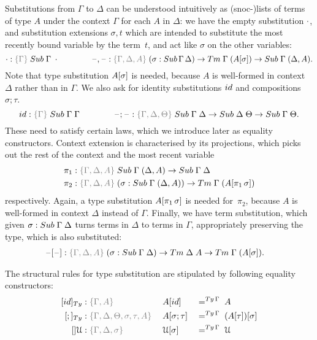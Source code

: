 \documentclass[a4paper,UKenglish,numberwithinsect,cleveref,thm-restate]{lipics-v2021}
\begin{document}
Substitutions from $\Gamma$ to $\Delta$ can be understood intuitively as (snoc-)lists of terms of type $A$ under the context $\Gamma$ for each $A$ in $\Delta$: we have the empty substitution $\cdot$, and substitution extensions $\sigma, t$ which are intended to substitute the most recently bound variable by the term~$t$, and act like $\sigma$ on the other variables:
\[
  \emptysub : \implicit{\Gamma}\;\Sub\;\Gamma\;\emptyctx
  \qquad\qquad
  \blank,\blank : \implicit{\Gamma, \Delta, A}\; (\sigma : \Sub\,\Gamma\,\Delta) \to \Tm\;\Gamma\;(\sub{A}{\sigma}) \to \Sub\;\Gamma\;(\Delta, A).
\]
Note that type substitution ${{A}[ \sigma ]}$ is needed, because $A$ is well-formed in context $\Delta$ rather than in $\Gamma$.
We also ask for identity substitutions $\idS$ and compositions $\sigma;\tau$.
\[
  \idS : \implicit{\Gamma}\; \Sub\;\Gamma\;\Gamma
  \qquad\qquad \blank;\blank : \implicit{\Gamma, \Delta, \Theta}\;\Sub\;\Gamma\;\Delta \to \Sub\;\Delta\;\Theta \to \Sub\;\Gamma\;\Theta.
\]
These need to satisfy certain laws, which we introduce later as equality constructors.
Context extension is characterised by its projections, which picks out the rest of the context and the most recent variable
\begin{alignat*}{3}
  \pi_1 & : \implicit{\Gamma, \Delta, A}\;\Sub\;\Gamma\;(\Delta, A) \to \Sub\;\Gamma\;\Delta \\
  \pi_2 & : \implicit{\Gamma, \Delta, A}\;(\sigma : \Sub\;\Gamma\;(\Delta, A)) \to \Tm\;\Gamma\;(\sub{A}{\pi_1\,\sigma})
\end{alignat*}
respectively.
Again, a type substitution ${{A}[ \pi_1\,\sigma ]}$ is needed for~$\pi_2$, because $A$ is well-formed in context $\Delta$ instead of $\Gamma$.
Finally, we have term substitution, which given $\sigma : \Sub\;\Gamma\;\Delta$ turns terms in $\Delta$ to terms in $\Gamma$, appropriately preserving the type, which is also substituted:
\begin{alignat*}{3}
  \sub{\blank}{\blank} & : \implicit{\Gamma,\Delta, A}\;(\sigma : \Sub\;\Gamma\;\Delta) \to \Tm\;\Delta\;A \to \Tm\;\Gamma\;(\sub{A}{\sigma}).
\end{alignat*}

The structural rules for type substitution are stipulated by following equality constructors:
\begin{alignat*}{3}
  [\idS]_{\Ty} & : \implicit{\Gamma, A}                               && \sub{A}{\idS}           && =^{\Ty\,\Gamma}\;A \\
  [;]_{\Ty}    & : \implicit{\Gamma, \Delta, \Theta, \sigma, \tau, A}\;&& \sub{A}{\sigma ; \tau}  && =^{\Ty\,\Gamma}\; \sub{(\sub{A}{\tau})}{\sigma} \\
  []\UU      & : \implicit{\Gamma, \Delta, \sigma}                    && \sub{\UU}{\sigma}        && =^{\Ty\,\Gamma}\;\UU
\end{alignat*}
\end{document}
